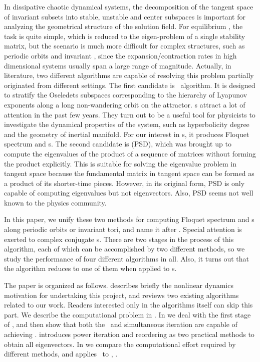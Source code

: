 \documentclass[final,leqno,onefignum,onetabnum]{siamltexmm}
\begin{document}
In dissipative chaotic dynamical systems, the decomposition of the
tangent space of invariant subsets into
stable, unstable and center subspaces is important for analyzing the
geometrical structure of the solution field.
For equilibrium ,
the task is quite simple, which is reduced to the eigen-problem of
a single stability matrix, but the scenario is much more difficult
for complex structures, such as periodic orbits and invariant ,
since the expansion/contraction rates in high dimensional systems usually
span a large range of  magnitude. Actually, in literature, two different
algorithms are capable of resolving this problem partially originated
from different settings. The first candidate is \cLv\
algorithm.
It is designed to stratify the Oseledets subspaces
corresponding to
the hierarchy of Lyapunov exponents along a long non-wandering orbit
on the attractor. \CLv s attract a lot of attention in the past few
years. They
turn out to be a useful tool for physicists
to investigate the dynamical properties of the system, such as
hyperbolicity degree and the geometry of
inertial manifold\rf{TaGiCh11, YaRa11, YaTaGiChRa08}.
For our
interest in \po s, it produces
Floquet spectrum and \Fv s. The second candidate is
\psd (PSD), which
was brought up to compute the eigenvalues of the product of a
sequence of matrices without forming the product explicitly. This is suitable
for solving the eigenvalue problem in tangent space because the
fundamental matrix in tangent space can be formed as a product of its shorter-time
pieces. However, in its original form, PSD is only capable of computing
eigenvalues but not eigenvectors. Also, PSD seems not well known to the
physics community.

In this paper, we unify these two methods for
computing Floquet spectrum and \Fv s along periodic orbits or invariant
tori, and name it after \emph{\ped}. Special attention is exerted to complex conjugate \Fv s.
There are two stages in the process of this algorithm,
each of which can be accomplished by two different methods, so
we study the performance of four different algorithms in all. Also,
it turns
out that the \edit{\cLv} algorithm reduces to one of them when
applied to \po s.

The paper is organized as follows.  describes
briefly the nonlinear dynamics motivation for undertaking this project,
and reviews two existing algorithms related to our
work. Readers interested only in the algorithms itself can skip this part.
We describe the
computational problem in . In  
we deal with the first stage of \ped, and then show that both the \pqr\
and simultaneous iteration are capable of achieving \psd.
\refSect{sect:eigenvec} introduces power iteration and reordering as two
practical methods to obtain all eigenvectors. In  we
compare the computational effort required by different methods, and
\refsect{sect:applic} applies \ped\ to \KSe,
.
\end{document}
